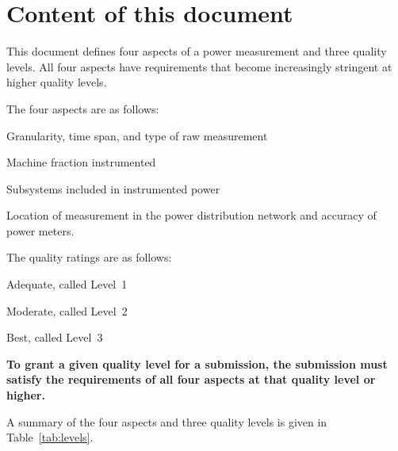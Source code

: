\section{Content of this document}


This document defines four aspects of a power measurement and three quality levels.
All four aspects have requirements that become increasingly stringent at higher quality levels. 

The four aspects are as follows:

\begin{packed_enum}
\item 
Granularity, time span, and type of raw measurement
\item 
Machine fraction instrumented
\item 
Subsystems included in instrumented power
\item 
Location of measurement in the power distribution network and accuracy of power meters.
\end{packed_enum}


The quality ratings are as follows:

\begin{packed_item}
\item 
Adequate, called Level~1
\item
Moderate, called Level~2
\item
Best, called Level~3
\end{packed_item}

\textbf{To grant a given quality level for a submission, the submission must satisfy the requirements of all four aspects at that quality level or higher.}

A summary of the four aspects and three quality levels is given in Table~\ref{tab:levels}.
